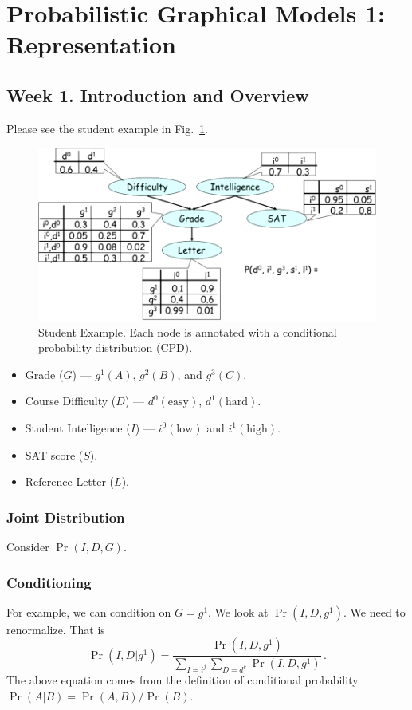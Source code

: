 \documentclass[12pt]{article}
\begin{document}
\section{Probabilistic Graphical Models 1: Representation}

\subsection{Week 1. Introduction and Overview}

Please see the student example in Fig.~\ref{fig:student_example}.

\begin{figure}[H]
\centering
\includegraphics[width=6.5in]{graphics/example_student.png}
\caption{Student Example. Each node is annotated with a conditional probability distribution (CPD).}
\label{fig:student_example}
\end{figure}


\begin{itemize}
    \item Grade ($G$) --- $g^1(A)$, $g^2(B)$, and $g^3(C)$.
    \item Course Difficulty ($D$) --- $d^0(\text{easy})$, $d^1(\text{hard})$.
    \item Student Intelligence ($I$) --- $i^0(\text{low})$ and $i^1(\text{high})$.
    \item SAT score ($S$).
    \item Reference Letter ($L$).
\end{itemize}
 



\subsubsection{Joint Distribution}
Consider $\Pr(I, D, G)$.

\subsubsection{Conditioning}
For example, we can condition on $G=g^1$.  We look at $\Pr(I, D, g^1)$.
We need to renormalize. That is
\begin{equation*}
  \Pr(I, D | g^1) = \frac{\Pr(I, D, g^1)}
                         {\sum_{I=i^j} \sum_{D=d^k} \Pr(I, D, g^1)}  \, .
\end{equation*}
The above equation comes from the definition of conditional probability $\Pr(A | B) = \Pr(A, B) / \Pr(B)$.
\end{document}
